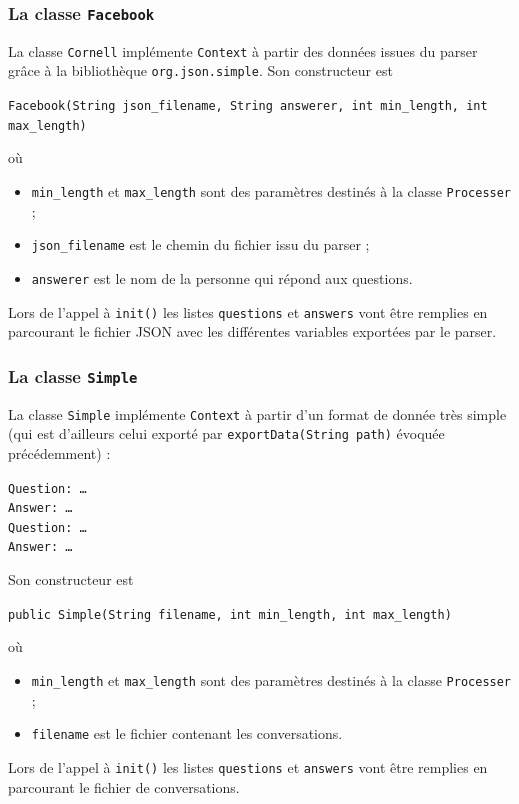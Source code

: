 \documentclass[10pt,a4paper]{article}
\newcommand\tab[1][0.5cm]{\hspace*{#1}}
\begin{document}
\subsubsection{La classe \texttt{Facebook}}
La classe \texttt{Cornell} implémente \texttt{Context} à partir des données issues du parser grâce à la bibliothèque \texttt{org.json.simple}. Son constructeur est
\begin{center}
	\texttt{Facebook(String json\_filename, String answerer, int min\_length, int max\_length)}
\end{center}
où
\begin{itemize}
	\item \texttt{min\_length} et \texttt{max\_length} sont des paramètres destinés à la classe \texttt{Processer} ;
	\item \texttt{json\_filename} est le chemin du fichier issu du parser ;
	\item \texttt{answerer} est le nom de la personne qui répond aux questions.
\end{itemize}
\tab  Lors de l'appel à \texttt{init()} les listes \texttt{questions} et \texttt{answers} vont être remplies en parcourant le fichier JSON avec les différentes variables exportées par le parser.

\subsubsection{La classe \texttt{Simple}}
La classe \texttt{Simple} implémente \texttt{Context} à partir d'un format de donnée très simple (qui est d'ailleurs celui exporté par \texttt{exportData(String path)} évoquée précédemment) :
\begin{center}
	\texttt{Question: \ldots} \\
	\texttt{Answer: \ldots} \\
	\texttt{Question: \ldots} \\
	\texttt{Answer: \ldots} \\
\end{center}
Son constructeur est
\begin{center}
	\texttt{public Simple(String filename, int min\_length, int max\_length)}
\end{center}
où
\begin{itemize}
	\item \texttt{min\_length} et \texttt{max\_length} sont des paramètres destinés à la classe \texttt{Processer} ;
	\item \texttt{filename} est le fichier contenant les conversations.
\end{itemize}
\tab  Lors de l'appel à \texttt{init()} les listes \texttt{questions} et \texttt{answers} vont être remplies en parcourant le fichier de conversations.
\end{document}
